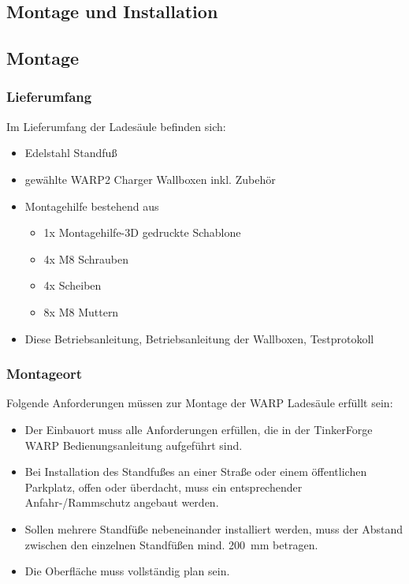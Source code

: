 \documentclass[a4paper,10pt]{article}
\begin{document}
\begin{multicols*}{2}
	\section{Montage und Installation}
	\subsection{Montage}
	\subsubsection{Lieferumfang}
	Im Lieferumfang der Ladesäule befinden sich:
	\begin{itemize}
		\item Edelstahl Standfuß
		\item gewählte WARP2 Charger Wallboxen inkl. Zubehör
		\item Montagehilfe bestehend aus
			\begin{itemize}
				\item 1x Montagehilfe-3D gedruckte Schablone
				\item 4x M8 Schrauben
				\item 4x Scheiben
				\item 8x M8 Muttern
			\end{itemize}
		\item Diese Betriebsanleitung, Betriebsanleitung der Wallboxen,
		Testprotokoll
	\end{itemize}

	\subsubsection{Montageort}

	Folgende Anforderungen müssen zur Montage der WARP Ladesäule erfüllt sein:
	\begin{itemize}
		\item Der Einbauort muss alle Anforderungen erfüllen, die in der
		TinkerForge WARP Bedienungsanleitung aufgeführt sind.
		\item Bei Installation des Standfußes an einer Straße oder einem
		öffentlichen Parkplatz, offen oder überdacht, muss ein entsprechender 
		Anfahr-/Rammschutz angebaut werden.
		\item Sollen mehrere Standfüße nebeneinander installiert werden, muss
		der Abstand zwischen den einzelnen Standfüßen mind. \SI{200}{\milli\meter} betragen.
		\item Die Oberfläche muss vollständig plan sein.
	\end{itemize}


\end{multicols*}
\end{document}
